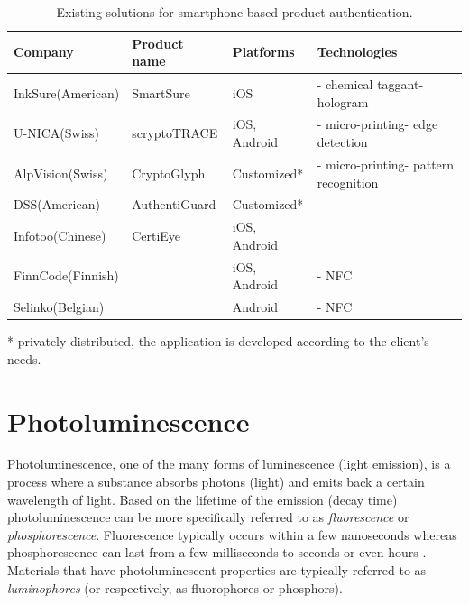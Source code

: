 \documentclass[thesis.tex]{subfiles}
\begin{document}
\begin{table}[h]
	\caption{Existing solutions for smartphone-based product authentication.} \label{table:existing-solutions}

	\begin{center}
	\begin{tabular}{| m{2cm} | m{3.25cm} | m{3cm} | m{3.75cm} |}

		\hline
		\textbf{Company}				&	\textbf{Product name}			&	\textbf{Platforms}			&	\textbf{Technologies} \\ \hline
		InkSure\newline (American)		&	SmartSure						&	iOS						&	- chemical taggant\newline- hologram \\ \hline
		U-NICA\newline (Swiss)			&	scryptoTRACE\textregistered		&	iOS, Android				&	- micro-printing\newline- edge detection \\ \hline
		AlpVision\newline (Swiss)		&	CryptoGlyph\textregistered		&	Customized\footnotesize{*}	&	- micro-printing\newline- pattern recognition \\ \hline
		DSS\newline (American)			&	AuthentiGuard					&	Customized\footnotesize{*}	&	 \\ \hline
		Infotoo\newline (Chinese)		&	CertiEye						&	iOS, Android				&	 \\ \hline
		FinnCode\newline (Finnish)		&									&	iOS, Android				&	- NFC \\ \hline
		Selinko\newline (Belgian)		&									&	Android						&	- NFC \\
		\hline
	\end{tabular}
	\end{center}
	\scriptsize{*} \small{privately distributed, the application is developed according to the client's needs.}
\end{table}

\section{Photoluminescence}
\label{section:photoluminescence}

Photoluminescence, one of the many forms of luminescence (light emission), is a process where a substance absorbs photons (light) and emits back a certain wavelength of light. Based on the lifetime of the emission (decay time) photoluminescence can be more specifically referred to as \emph{fluorescence} or \emph{phosphorescence}. Fluorescence typically occurs within a few nanoseconds whereas phosphorescence can last from a few milliseconds to seconds or even hours \cite{luminescence_basics}. Materials that have photoluminescent properties are typically referred to as \emph{luminophores} (or respectively, as fluorophores or phosphors).
\end{document}
